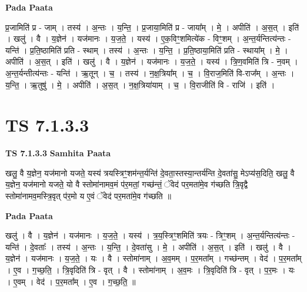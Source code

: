 \documentclass[17pt]{extarticle}
\begin{document}
\textbf{Pada Paata} \newline

प्र॒जामिति॑ प्र - जाम् । तस्य॑ । अ॒न्तः । य॒न्ति॒ । प्र॒जाया॒मिति॑ प्र - जाया᳚म् । मे॒ । अपीति॑ । अ॒स॒त् । इति॑ । खलु॑ । वै । य॒ज्ञेन॑ । यज॑मानः । य॒ज॒ते॒ । यस्य॑ । ए॒क॒विꣳ॒॒शमित्ये॑क - विꣳ॒॒शम् । अ॒न्त॒र्यन्तित्य॑न्तः - यन्ति॑ । प्र॒ति॒ष्ठामिति॑ प्रति - स्थाम् । तस्य॑ । अ॒न्तः । य॒न्ति॒ । प्र॒ति॒ष्ठाया॒मिति॑ प्रति - स्थाया᳚म् । मे॒ । अपीति॑ । अ॒स॒त् । इति॑ । खलु॑ । वै । य॒ज्ञेन॑ । यज॑मानः । य॒ज॒ते॒ । यस्य॑ । त्रि॒ण॒वमिति॑ त्रि - न॒वम् । अ॒न्त॒र्यन्तीत्य॑न्तः - यन्ति॑ । ऋ॒तून् । च॒ । तस्य॑ । न॒क्ष॒त्रिया᳚म् । च॒ । वि॒राज॒मिति॑ वि-राज᳚म् । अ॒न्तः । य॒न्ति॒ । ऋ॒तुषु॑ । मे॒ । अपीति॑ । अ॒स॒त् । न॒क्ष॒त्रिया॑याम् । च॒ । वि॒राजीति॑ वि - राजि॑ । इति॑ ।  \newline





\section{ TS 7.1.3.3 }

\textbf{TS 7.1.3.3 } \newline
\textbf{Samhita Paata} \newline

खलु॒ वै य॒ज्ञेन॒ यज॑मानो यजते॒ यस्य॑ त्रयस्त्रिꣳ॒॒शम॑न्त॒र्यन्ति॑ दे॒वता॒स्तस्या॒न्तर्य॑न्ति दे॒वता॑सु॒ मेऽप्य॑स॒दिति॒ खलु॒ वै य॒ज्ञेन॒ यज॑मानो यजते॒ यो वै स्तोमा॑नामव॒मं प॑र॒मतां॒ गच्छ॑न्तं॒ ॅवेद॑ पर॒मता॑मे॒व ग॑च्छति त्रि॒वृद्वै स्तोमा॑नामव॒मस्त्रि॒वृत् प॑र॒मो य ए॒वं ॅवेद॑ पर॒मता॑मे॒व ग॑च्छति ॥ \newline

\textbf{Pada Paata} \newline

खलु॑ । वै । य॒ज्ञेन॑ । यज॑मानः । य॒ज॒ते॒ । यस्य॑ । त्र॒य॒स्त्रिꣳ॒॒शमिति॑ त्रयः - त्रिꣳ॒॒शम् । अ॒न्त॒र्यन्तित्य॑न्तः - यन्ति॑ । दे॒वताः᳚ । तस्य॑ । अ॒न्तः । य॒न्ति॒ । दे॒वता॑सु । मे॒ । अपीति॑ । अ॒स॒त् । इति॑ । खलु॑ । वै । य॒ज्ञेन॑ । यज॑मानः । य॒ज॒ते॒ । यः । वै । स्तोमा॑नाम् । अ॒व॒मम् । प॒र॒मता᳚म् । गच्छ॑न्तम् । वेद॑ । प॒र॒मता᳚म् । ए॒व । ग॒च्छ॒ति॒ । त्रि॒वृदिति॑ त्रि - वृत् । वै । स्तोमा॑नाम् । अ॒व॒मः । त्रि॒वृदिति॑ त्रि - वृत् । प॒र॒मः । यः । ए॒वम् । वेद॑ । प॒र॒मता᳚म् । ए॒व । ग॒च्छ॒ति॒ ॥  \newline




\end{document}

